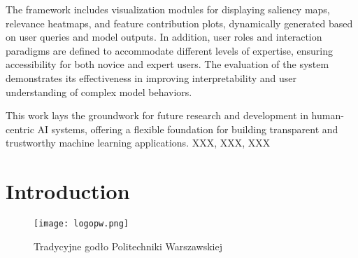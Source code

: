 \documentclass[
    bindingoffset=5mm,  %
    footnoteindent=3mm, %
    hyphenation=true    %
]{src/wut-thesis}
\begin{document}
The framework includes visualization modules for displaying saliency maps, relevance heatmaps, and feature contribution plots, dynamically generated based on user queries and model outputs. In addition, user roles and interaction paradigms are defined to accommodate different levels of expertise, ensuring accessibility for both novice and expert users. The evaluation of the system demonstrates its effectiveness in improving interpretability and user understanding of complex model behaviors.

This work lays the groundwork for future research and development in human-centric AI systems, offering a flexible foundation for building transparent and trustworthy machine learning applications.
\keywords XXX, XXX, XXX


\pagestyle{plain}

\cleardoublepage %
\tableofcontents

\cleardoublepage %
\pagestyle{headings}

%
%
\clearpage %
\section{Introduction} \label{ch:introduction}

\lipsum[1] \cite{goossens93}

\begin{figure}[!h]
    \centering \texttt{[image: logopw.png]}
    \caption{Tradycyjne godło Politechniki Warszawskiej}
    \label{fig:tradycyjne-logo-pw}
\end{figure}
\end{document}
